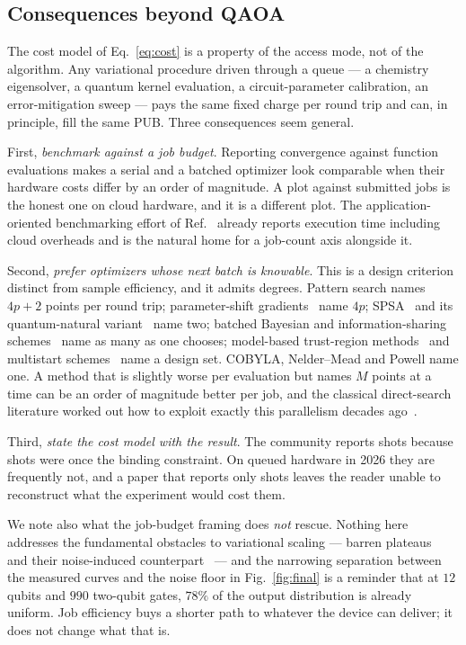 \documentclass[aps,prx,preprint,superscriptaddress,nofootinbib,longbibliography]{revtex4-2}
\begin{document}
\subsection{Consequences beyond QAOA}

The cost model of Eq.~\eqref{eq:cost} is a property of the access mode, not of the algorithm.
Any variational procedure driven through a queue --- a chemistry eigensolver, a quantum
kernel evaluation, a circuit-parameter calibration, an error-mitigation sweep --- pays the
same fixed charge per round trip and can, in principle, fill the same PUB. Three consequences
seem general.

First, \emph{benchmark against a job budget}. Reporting convergence against function
evaluations makes a serial and a batched optimizer look comparable when their hardware costs
differ by an order of magnitude. A plot against submitted jobs is the honest one on cloud
hardware, and it is a different plot. The application-oriented benchmarking effort of
Ref.~\cite{lubinski2023benchmarks} already reports execution time including cloud overheads and
is the natural home for a job-count axis alongside it.

Second, \emph{prefer optimizers whose next batch is knowable}. This is a design criterion distinct
from sample efficiency, and it admits degrees. Pattern search names $4p+2$ points per round
trip; parameter-shift gradients~\cite{mitarai2018qcl,schuld2019gradients} name $4p$;
SPSA~\cite{spall1992spsa} and its quantum-natural variant~\cite{gacon2021qfi} name two; batched
Bayesian and information-sharing schemes~\cite{self2021infosharing} name as many as one chooses;
model-based trust-region methods~\cite{sung2020models} and multistart
schemes~\cite{shaydulin2019multistart} name a design set. COBYLA, Nelder--Mead and Powell name
one. A method that is slightly worse per evaluation but names $M$ points at a time can be an
order of magnitude better per job, and the classical direct-search literature worked out how to
exploit exactly this parallelism decades ago~\cite{hough2001apps}.

Third, \emph{state the cost model with the result}. The community reports shots because shots
were once the binding constraint. On queued hardware in 2026 they are frequently not, and a
paper that reports only shots leaves the reader unable to reconstruct what the experiment
would cost them.

We note also what the job-budget framing does \emph{not} rescue. Nothing here addresses the
fundamental obstacles to variational scaling --- barren plateaus~\cite{mcclean2018barren} and
their noise-induced counterpart~\cite{wang2021noisebp} --- and the narrowing separation
between the measured curves and the noise floor in Fig.~\ref{fig:final} is a reminder that
at $12$ qubits and $990$ two-qubit gates, $78\%$ of the output distribution is already
uniform. Job efficiency buys a shorter path to whatever the device can deliver; it does not
change what that is.
\end{document}
